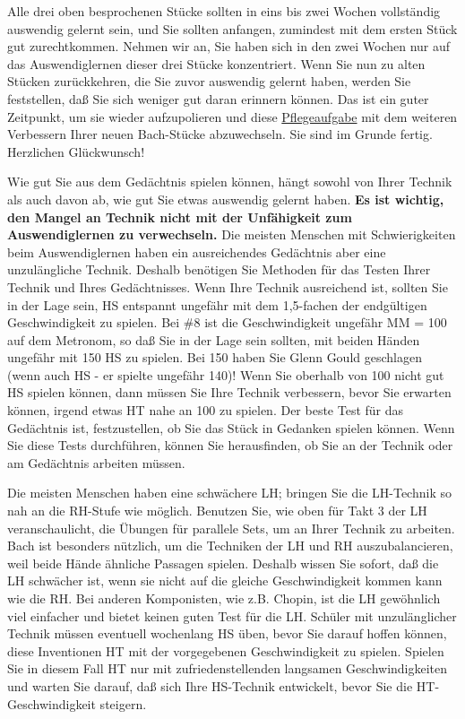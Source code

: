 Alle drei oben besprochenen Stücke sollten in eins bis zwei Wochen vollständig auswendig gelernt sein, und Sie sollten anfangen, zumindest mit dem ersten Stück gut zurechtkommen.
Nehmen wir an, Sie haben sich in den zwei Wochen nur auf das Auswendiglernen dieser drei Stücke konzentriert.
Wenn Sie nun zu alten Stücken zurückkehren, die Sie zuvor auswendig gelernt haben, werden Sie feststellen, daß Sie sich weniger gut daran erinnern können.
Das ist ein guter Zeitpunkt, um sie wieder aufzupolieren und diese \hyperlink{c1iii6f}{Pflegeaufgabe} mit dem weiteren Verbessern Ihrer neuen Bach-Stücke abzuwechseln.
Sie sind im Grunde fertig.
Herzlichen Glückwunsch!

Wie gut Sie aus dem Gedächtnis spielen können, hängt sowohl von Ihrer Technik als auch davon ab, wie gut Sie etwas auswendig gelernt haben.
\textbf{Es ist wichtig, den Mangel an Technik nicht mit der Unfähigkeit zum Auswendiglernen zu verwechseln.}
Die meisten Menschen mit Schwierigkeiten beim Auswendiglernen haben ein ausreichendes Gedächtnis aber eine unzulängliche Technik.
Deshalb benötigen Sie Methoden für das Testen Ihrer Technik und Ihres Gedächtnisses.
Wenn Ihre Technik ausreichend ist, sollten Sie in der Lage sein, HS entspannt ungefähr mit dem 1,5-fachen der endgültigen Geschwindigkeit zu spielen.
Bei \#8 ist die Geschwindigkeit ungefähr MM = 100 auf dem Metronom, so daß Sie in der Lage sein sollten, mit beiden Händen ungefähr mit 150 HS zu spielen.
Bei 150 haben Sie Glenn Gould geschlagen (wenn auch HS - er spielte ungefähr 140)!
Wenn Sie oberhalb von 100 nicht gut HS spielen können, dann müssen Sie Ihre Technik verbessern, bevor Sie erwarten können, irgend etwas HT nahe an 100 zu spielen.
Der beste Test für das Gedächtnis ist, festzustellen, ob Sie das Stück in Gedanken spielen können.
Wenn Sie diese Tests durchführen, können Sie herausfinden, ob Sie an der Technik oder am Gedächtnis arbeiten müssen.

Die meisten Menschen haben eine schwächere LH; bringen Sie die LH-Technik so nah an die RH-Stufe wie möglich.
Benutzen Sie, wie oben für Takt 3 der LH veranschaulicht, die Übungen für parallele Sets, um an Ihrer Technik zu arbeiten.
Bach ist besonders nützlich, um die Techniken der LH und RH auszubalancieren, weil beide Hände ähnliche Passagen spielen.
Deshalb wissen Sie sofort, daß die LH schwächer ist, wenn sie nicht auf die gleiche Geschwindigkeit kommen kann wie die RH.
Bei anderen Komponisten, wie z.B. Chopin, ist die LH gewöhnlich viel einfacher und bietet keinen guten Test für die LH.
Schüler mit unzulänglicher Technik müssen eventuell wochenlang HS üben, bevor Sie darauf hoffen können, diese Inventionen HT mit der vorgegebenen Geschwindigkeit zu spielen.
Spielen Sie in diesem Fall HT nur mit zufriedenstellenden langsamen Geschwindigkeiten und warten Sie darauf, daß sich Ihre HS-Technik entwickelt, bevor Sie die HT-Geschwindigkeit steigern.

